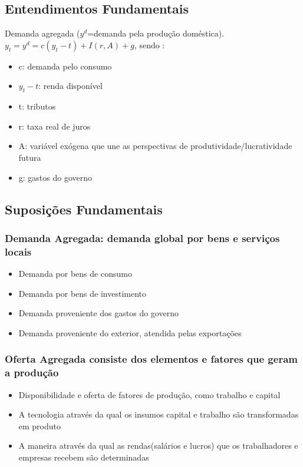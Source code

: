 \documentclass[a4paper,12pt]{article}[abntex2]
\begin{document}
\subsection{\textbf{Entendimentos Fundamentais}}
Demanda agregada ($y^d$=demanda pela produção doméstica). $y_t=y^d=c(y_t-t)+I(r,A)+g$, sendo : \begin{itemize}
    \item c: demanda pelo consumo
    \item $y_t-t$: renda disponível
    \item t: tributos
    \item r: taxa real de juros
    \item A: variável exógena que une as perspectivas de produtividade/lucratividade futura
    \item g: gastos do governo
\end{itemize}

\subsection{\textbf{Suposições Fundamentais}}
\subsubsection{\textbf{Demanda Agregada: demanda global por bens e serviços locais}}
\begin{itemize}
    \item Demanda por bens de consumo 
    \item Demanda por bens de investimento
    \item Demanda proveniente dos gastos do governo 
    \item Demanda proveniente do exterior, atendida pelas exportações
\end{itemize}

\subsubsection{\textbf{Oferta Agregada consiste dos elementos e fatores que geram a produção}}
\begin{itemize}
    \item Disponibilidade e oferta de fatores de produção, como trabalho e capital
    \item A tecnologia através da qual os insumos capital e trabalho são transformadas em produto
    \item A maneira através da qual as rendas(salários e lucros) que os trabalhadores e empresas recebem são determinadas
\end{itemize}
\end{document}
